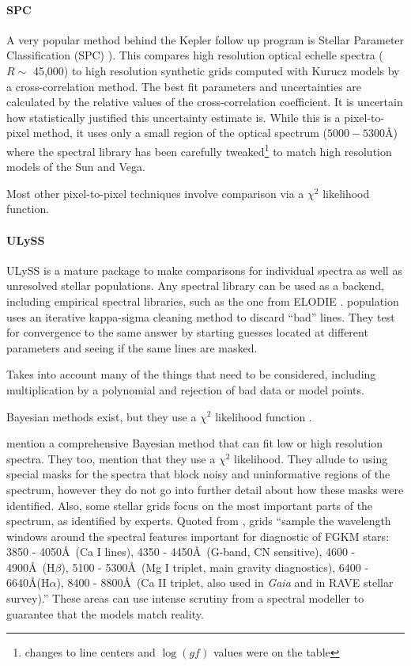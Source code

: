 \documentclass[preprint]{aastex} %
\begin{document}
\paragraph{SPC} A very popular method behind the Kepler follow up program is Stellar Parameter Classification (SPC) \citep{blj+12}). This compares high resolution optical echelle spectra ($R \sim$ 45,000) to high resolution synthetic grids computed with Kurucz models by a cross-correlation method. The best fit parameters and uncertainties are calculated by the relative values of the cross-correlation coefficient. It is uncertain how statistically justified this uncertainty estimate is. While this is a pixel-to-pixel method, it uses only a small region of the optical spectrum ($5000 - 5300$\AA) where the spectral library has been carefully tweaked\footnote{changes to line centers and $\log(gf)$ values were on the table} to match  high resolution models of the Sun and Vega. 

Most other pixel-to-pixel techniques involve comparison via a $\chi^2$ likelihood function.

\paragraph{ULySS} ULySS \citep{kpb+09} is a mature package to make comparisons for individual spectra as well as unresolved stellar populations. Any spectral library can be used as a backend, including empirical spectral libraries, such as the one from ELODIE \citep{psk+07}. population uses an iterative kappa-sigma cleaning method to discard ``bad'' lines. They test for convergence to the same answer by starting guesses located at different parameters and seeing if the same lines are masked.

Takes into account many of the things that need to be considered, including multiplication by a polynomial and rejection of bad data or model points.

Bayesian methods exist, but they use a $\chi^2$ likelihood function \citep{sdm+07}.


\citet{sb13} mention a comprehensive Bayesian method that can fit low or high resolution spectra. They too, mention that they use a $\chi^2$ likelihood. They allude to using special masks for the spectra that block noisy and uninformative regions of the spectrum, however they do not go into further detail about how these masks were identified. Also, some stellar grids focus on the most important parts of the spectrum, as identified by experts. Quoted from \citet{sb13}, grids ``sample the wavelength windows around the spectral features important for diagnostic of FGKM stars: 3850 - 4050\AA\ (Ca I lines), 4350 - 4450\AA\ (G-band, CN sensitive), 4600 - 4900\AA\ (H$\beta$), 5100 - 5300\AA\ (Mg I triplet, main gravity diagnostics), 6400 - 6640\AA (H$\alpha$), 8400 - 8800\AA\ (Ca II triplet, also used in \emph{Gaia} and in RAVE stellar survey).'' These areas can use intense scrutiny from a spectral modeller to guarantee that the models match reality.
\end{document}
